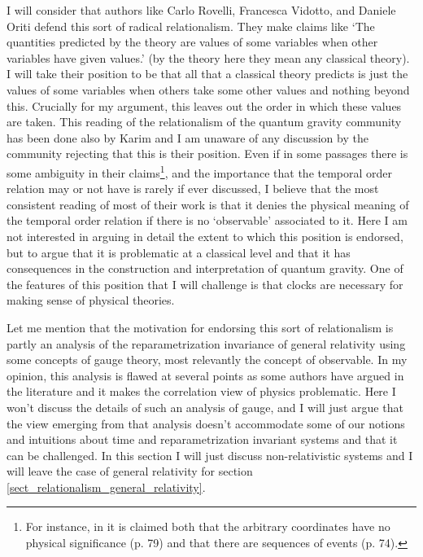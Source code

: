 \documentclass[12 pt]{article}
\begin{document}
I will consider that authors like Carlo Rovelli, Francesca Vidotto, and Daniele Oriti \citep{Rovelli1991,Rovelli1996,Rovelli2002,Rovelli2004,Rovelli2011,Rovelli2015,Vidotto2017,Rovelli2022,Oriti2021a,Oriti2021,Marchetti2021}  defend this sort of radical relationalism. They make claims like `The quantities predicted by the theory are values of some variables when other variables have given values.' \citep[p. 21]{Rovelli2022} (by the theory here they mean any classical theory). I will take their position to be that all that a classical theory predicts is just the values of some variables when others take some other values and nothing beyond this. Crucially for my argument, this leaves out the order in which these values are taken. This reading of the relationalism of the quantum gravity community has been done also by Karim \cite{Thebault2012,Thebault2021} and I am unaware of any discussion by the community rejecting that this is their position. Even if in some passages there is some ambiguity in their claims\footnote{For instance, in \citep{Rovelli2004} it is claimed both that the arbitrary coordinates have no physical significance (p. 79) and that there are sequences of events (p. 74).}, and the importance that the temporal order relation may or not have is rarely if ever discussed, I believe that the most consistent reading of most of their work is that it denies the physical meaning of the temporal order relation if there is no `observable' associated to it. Here I am not interested in arguing in detail the extent to which this position is endorsed, but to argue that it is problematic at a classical level and that it has consequences in the construction and interpretation of quantum gravity. One of the features of this position that I will challenge is that clocks are necessary for making sense of physical theories.

Let me mention that the motivation for endorsing this sort of relationalism is partly an analysis of the reparametrization invariance of general relativity using some concepts of gauge theory, most relevantly the concept of observable. In my opinion, this analysis is flawed at several points as some authors have argued in the literature \citep{Maudlin2002,Pitts2014-PITCIH,Pitts2017,MozotaFrauca2023} and it makes the correlation view of physics problematic. Here I won't discuss the details of such an analysis of gauge, and I will just argue that the view emerging from that analysis doesn't accommodate some of our notions and intuitions about time and reparametrization invariant systems and that it can be challenged. In this section I will just discuss non-relativistic systems and I will leave the case of general relativity for section \ref{sect_relationalism_general_relativity}.
\end{document}
